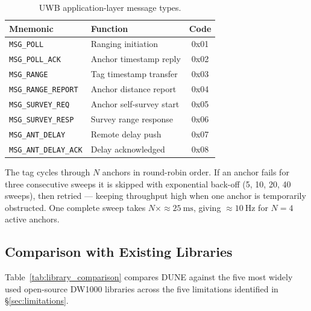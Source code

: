 \begin{table}[h]
  \centering
  \caption{UWB application-layer message types.}
  \label{tab:msg_types}
  \begin{tabular}{llc}
    \toprule
    Mnemonic & Function & Code \\
    \midrule
    \texttt{MSG\_POLL}          & Ranging initiation        & 0x01 \\
    \texttt{MSG\_POLL\_ACK}     & Anchor timestamp reply    & 0x02 \\
    \texttt{MSG\_RANGE}         & Tag timestamp transfer    & 0x03 \\
    \texttt{MSG\_RANGE\_REPORT} & Anchor distance report    & 0x04 \\
    \texttt{MSG\_SURVEY\_REQ}   & Anchor self-survey start  & 0x05 \\
    \texttt{MSG\_SURVEY\_RESP}  & Survey range response     & 0x06 \\
    \texttt{MSG\_ANT\_DELAY}    & Remote delay push         & 0x07 \\
    \texttt{MSG\_ANT\_DELAY\_ACK} & Delay acknowledged      & 0x08 \\
    \bottomrule
  \end{tabular}
\end{table}

The tag cycles through $N$ anchors in round-robin order.
If an anchor fails for three consecutive sweeps it is skipped with exponential
back-off (5, 10, 20, 40 sweeps), then retried --- keeping throughput high when
one anchor is temporarily obstructed.
One complete sweep takes $N \times \approx\SI{25}{\milli\second}$,
giving $\approx\SI{10}{\hertz}$ for $N = 4$ active anchors.

\subsection{Comparison with Existing Libraries}
\label{sec:library_comparison}

Table~\ref{tab:library_comparison} compares DUNE against the five most widely
used open-source DW1000 libraries across the five limitations identified in
\S\ref{sec:limitations}.

